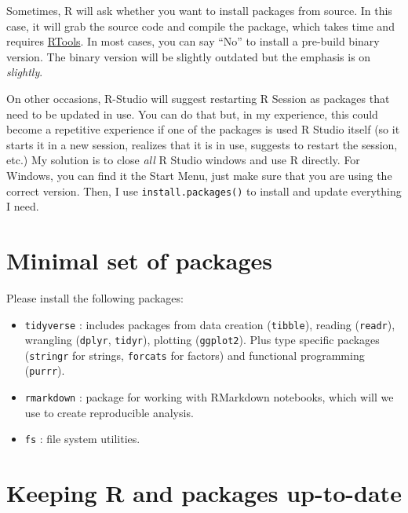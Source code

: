 \documentclass[
]{book}
\providecommand{\tightlist}{%
  \setlength{\itemsep}{0pt}\setlength{\parskip}{0pt}}
\begin{document}
Sometimes, R will ask whether you want to install packages from source. In this case, it will grab the source code and compile the package, which takes time and requires \protect\hyperlink{install-rtools}{RTools}. In most cases, you can say ``No'' to install a pre-build binary version. The binary version will be slightly outdated but the emphasis is on \emph{slightly}.

On other occasions, R-Studio will suggest restarting R Session as packages that need to be updated in use. You can do that but, in my experience, this could become a repetitive experience if one of the packages is used R Studio itself (so it starts it in a new session, realizes that it is in use, suggests to restart the session, etc.) My solution is to close \emph{all} R Studio windows and use R directly. For Windows, you can find it the Start Menu, just make sure that you are using the correct version. Then, I use \texttt{install.packages()} to install and update everything I need.

\hypertarget{minimal-set-of-packages}{%
\section*{Minimal set of packages}\label{minimal-set-of-packages}}

Please install the following packages:

\begin{itemize}
\tightlist
\item
  \texttt{tidyverse} : includes packages from data creation (\texttt{tibble}), reading (\texttt{readr}), wrangling (\texttt{dplyr}, \texttt{tidyr}), plotting (\texttt{ggplot2}). Plus type specific packages (\texttt{stringr} for strings, \texttt{forcats} for factors) and functional programming (\texttt{purrr}).
\item
  \texttt{rmarkdown} : package for working with RMarkdown notebooks, which will we use to create reproducible analysis.
\item
  \texttt{fs} : file system utilities.
\end{itemize}

\hypertarget{installr}{%
\section*{Keeping R and packages up-to-date}\label{installr}}
\end{document}
